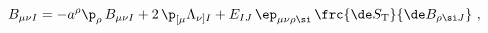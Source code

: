 \begin{equation}
  [\, \de_\eps\, ,\, \de_{\eps'}\, ] B_{\mu\nu I} = - a^\rho \p_\rho\,
  B_{\mu\nu I} + 2\, \p_{[\mu} \Lambda_{\nu]I} + E_{IJ}\, \ep_{\mu\nu
  \rho\si}\, \frc{\de S_\mathrm{T}}{\de B_{\rho\si J}}\ ,
 \end{equation}

